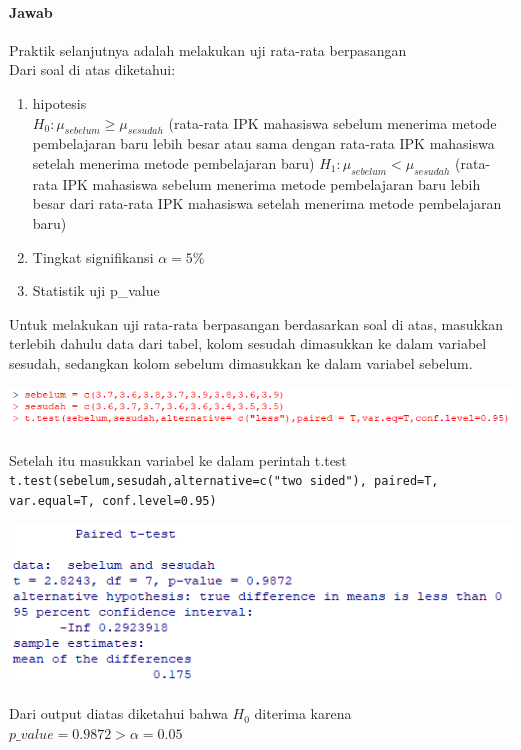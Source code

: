 \documentclass[a4paper,12pt]{article}
\begin{document}
\paragraph{Jawab\\}
Praktik selanjutnya adalah melakukan uji rata-rata berpasangan\\
Dari soal di atas diketahui:
\begin{enumerate}[label = \alph*.]
    \item hipotesis\\
        $H_{0} : \mu_{sebelum} \geq \mu_{sesudah}$ (rata-rata IPK mahasiswa sebelum menerima metode pembelajaran baru  lebih besar atau sama dengan rata-rata IPK mahasiswa setelah menerima
        metode pembelajaran baru)
        $H_{1} : \mu_{sebelum} < \mu_{sesudah}$ (rata-rata IPK mahasiswa sebelum menerima metode pembelajaran baru  lebih besar dari rata-rata IPK mahasiswa setelah menerima metode
        pembelajaran baru)
    \item Tingkat signifikansi $\alpha = 5\%$
    \item Statistik uji p\_value
\end{enumerate}
Untuk melakukan uji rata-rata berpasangan berdasarkan soal di atas, masukkan terlebih dahulu data dari tabel, kolom sesudah dimasukkan ke dalam variabel sesudah, sedangkan kolom sebelum
dimasukkan ke dalam variabel sebelum.\\
\begin{center}
    \includegraphics[width = \linewidth]{img3.png}
\end{center}
Setelah itu masukkan variabel ke dalam perintah t.test\\
\texttt{t.test(sebelum,sesudah,alternative=c("two sided"), paired=T, var.equal=T, conf.level=0.95)}
\begin{center}
    \includegraphics[width = \linewidth]{img4.png}
\end{center}
Dari output diatas diketahui bahwa $H_{0}$ diterima karena $p\_value = 0.9872 > \alpha = 0.05$
\end{document}
